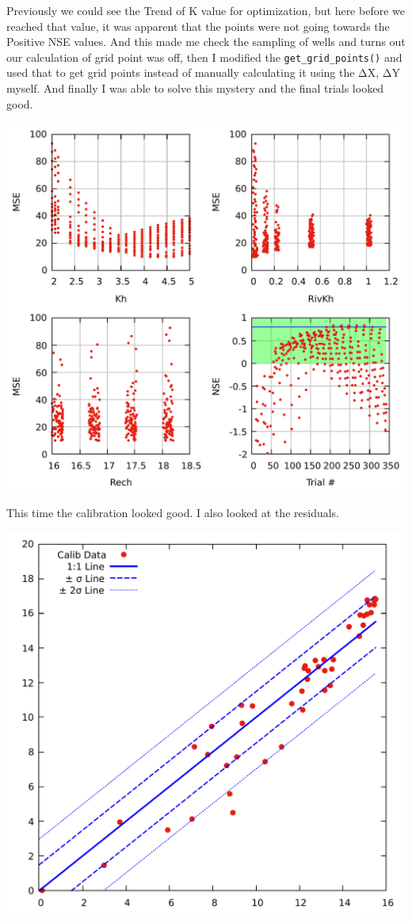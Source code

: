 \documentclass[titlepage,12pt]{unisubmission}
\begin{document}
Previously we could see the Trend of K value for optimization, but here before we reached that value, it was apparent that the points were not going towards the Positive NSE values. And this made me check the sampling of wells and turns out our calculation of grid point was off, then I modified the \texttt{get\_grid\_points()} and used that to get grid points instead of manually calculating it using the ΔX, ΔY myself. And finally I was able to solve this mystery and the final trials looked good.

\begin{center}
\includegraphics[width=.9\linewidth]{./images/4_calib-trials.pdf}
\end{center}

This time the calibration looked good. I also looked at the residuals.

\begin{center}
\includegraphics[width=.9\linewidth]{./images/4_calib-residuals.pdf}
\end{center}
\end{document}
